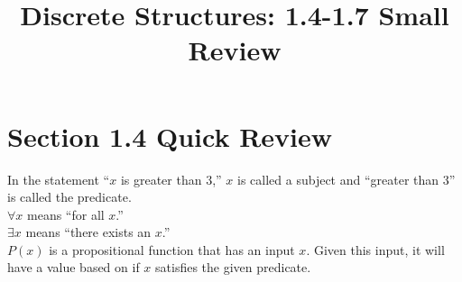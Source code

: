 \documentclass[table]{article}
\title{
    \vspace{2in}
    \textmd{\textbf{Discrete Structures: 1.4-1.7 Small Review}}\\
    \vspace{3in}
}
\author{\hmwkAuthorName}
\date{}
\begin{document}
\maketitle

\pagebreak

\section{Section 1.4 Quick Review}
In the statement ``$x$ is greater than $3$,'' $x$ is called a subject and ``greater than $3$'' is called the predicate.\\
$\forall x$ means ``for all $x$.''\\
$\exists x$ means ``there exists an $x$.''\\
$P(x)$ is a propositional function that has an input $x$. Given this input, it will have a value based on if $x$ satisfies the given predicate.
\end{document}
